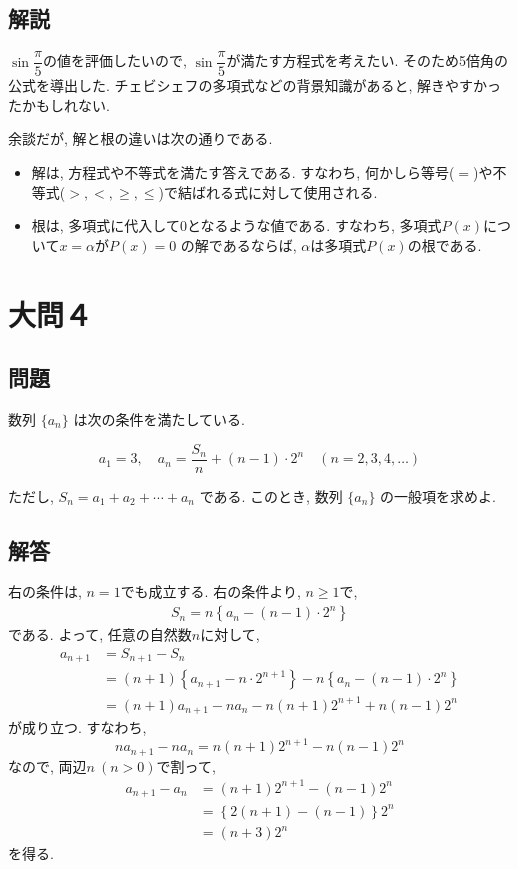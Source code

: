 \documentclass[dvipdfmx,a4paper]{jsarticle}
\begin{document}
    \subsection{解説}
    $\sin \dfrac{\pi}{5}$の値を評価したいので, $\sin \dfrac{\pi}{5}$が満たす方程式を考えたい. 
    そのため5倍角の公式を導出した. チェビシェフの多項式などの背景知識があると, 解きやすかったかもしれない. 

    余談だが, 解と根の違いは次の通りである. 
    \begin{itemize}
        \item 解は, 方程式や不等式を満たす答えである. すなわち, 何かしら等号($=$)や不等式($>,<,\geq, \leq$)で結ばれる式に対して使用される. 
        \item 根は, 多項式に代入して0となるような値である. すなわち, 多項式$P(x)$について$x=\alpha$が$P(x)=0$
        の解であるならば, $\alpha$は多項式$P(x)$の根である. 

    \end{itemize}

    \section{大問４}
    \subsection{問題}
    数列 $\{a_n\}$ は次の条件を満たしている. 

    \[
    a_1 = 3, \quad a_n = \frac{S_n}{n} + (n-1) \cdot 2^n \quad (n = 2, 3, 4, \ldots)
    \]

    ただし, $S_n = a_1 + a_2 + \cdots + a_n$ である. このとき, 数列 $\{a_n\}$ の一般項を求めよ. 
    \subsection{解答}
    右の条件は, $n=1$でも成立する. 右の条件より, $n\geq 1$で, 
    \begin{align*}
        S_n = n\left\{a_n -(n-1)\cdot 2^n\right\}
    \end{align*}
    である. よって, 任意の自然数$n$に対して, 
    \begin{align*}
        a_{n+1} &= S_{n+1} - S_n \\
                &= (n+1)\left\{a_{n+1} -n\cdot 2^{n+1}\right\} - n\left\{a_n -(n-1)\cdot 2^n\right\} \\
                &= (n+1)a_{n+1} - na_n -n(n+1)2^{n+1} + n(n-1)2^n
    \end{align*}
    が成り立つ. すなわち, 
    \[
        na_{n+1} - na_n = n(n+1)2^{n+1} - n(n-1)2^n
    \]
    なので, 両辺$n\ (n>0)$で割って, 
    \begin{align*}
        a_{n+1} - a_n &= (n+1)2^{n+1} - (n-1)2^n \\
        &= \left\{2(n+1)-(n-1)\right\}2^n \\
        &= (n+3)2^n
    \end{align*}
    を得る. 
\end{document}
